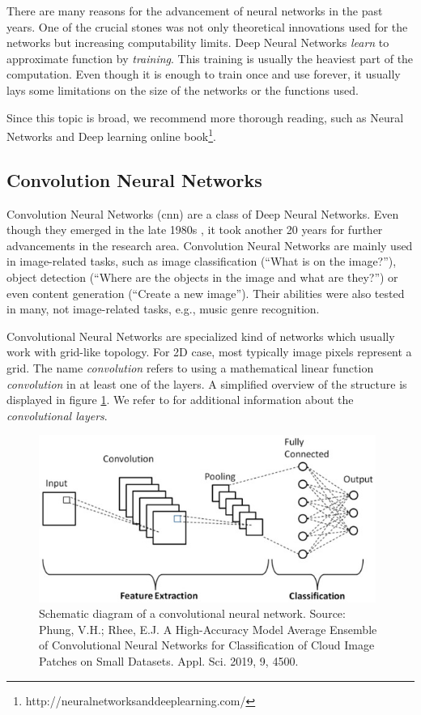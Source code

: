 There are many reasons for the advancement of neural networks in the past years. One of the crucial stones was not only theoretical innovations used for the networks but increasing computability limits. Deep Neural Networks \emph{learn} to approximate function by \emph{training}. This training is usually the heaviest part of the computation. Even though it is enough to train once and use forever, it usually lays some limitations on the size of the networks or the functions used.

Since this topic is broad, we recommend more thorough reading, such as Neural Networks and Deep learning online book\footnote{http://neuralnetworksanddeeplearning.com/}.

\subsection{Convolution Neural Networks}

Convolution Neural Networks (\acrshort{cnn}) are a class of Deep Neural Networks. Even though they emerged in the late 1980s \citep{lecun1989backpropagation}, it took another 20 years for further advancements in the research area. Convolution Neural Networks are mainly used in image-related tasks, such as image classification (``What is on the image?''), object detection (``Where are the objects in the image and what are they?'') or even content generation (``Create a new image''). Their abilities were also tested in many, not image-related tasks, e.g., music genre recognition.

Convolutional Neural Networks are specialized kind of networks which usually work with grid-like topology. For 2D case, most typically image pixels represent a grid. The name \emph{convolution} refers to using a mathematical linear function \emph{convolution} in at least one of the layers. A simplified overview of the structure is displayed in figure \ref{fig:convolution_neural_network}. We refer to \cite{Goodfellow-et-al-2016} for additional information about the \emph{convolutional layers}.

\begin{figure}
    \centering
    \includegraphics[width=0.98\textwidth]{img/convolution_neural_network.jpg}
    \caption{Schematic diagram of a convolutional neural network. Source: Phung, V.H.; Rhee, E.J. A High-Accuracy Model Average Ensemble of Convolutional Neural Networks for Classification of Cloud Image Patches on Small Datasets. Appl. Sci. 2019, 9, 4500.}
    \label{fig:convolution_neural_network}
\end{figure}

